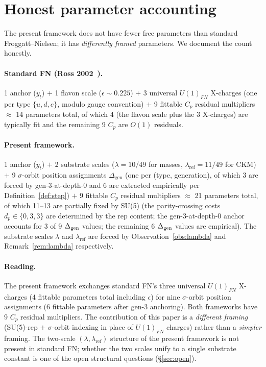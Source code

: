\documentclass[11pt,reqno]{amsart}
\theoremstyle{plain}
\theoremstyle{definition}
\theoremstyle{remark}
\begin{document}
\section{Honest parameter accounting}\label{sec:params}

The present framework does not have fewer free parameters than
standard Froggatt--Nielsen; it has \emph{differently framed}
parameters. We document the count honestly.

\paragraph{Standard FN (Ross 2002~\cite{Ross2002}).} 1 anchor
($y_t$) $+$ 1 flavon scale ($\epsilon \sim 0.225$) $+$ 3
universal $U(1)_{FN}$ X-charges (one per type $\{u, d, e\}$,
modulo gauge convention) $+$ 9 fittable $C_{p}$ residual
multipliers $\approx$ 14 parameters total, of which 4 (the
flavon scale plus the 3 X-charges) are typically fit and the
remaining 9 $C_p$ are $O(1)$ residuals.

\paragraph{Present framework.} 1 anchor ($y_t$) $+$ 2 substrate
scales ($\lambda = 10/49$ for masses, $\lambda_{\mathrm{ref}} =
11/49$ for CKM) $+$ 9 $\sigma$-orbit position assignments
$\Delta_{\mathrm{gen}}$ (one per (type, generation), of which
3 are forced by gen-3-at-depth-0 and 6 are extracted
empirically per Definition~\ref{def:step}) $+$ 9 fittable
$C_{p}$ residual multipliers $\approx$ 21 parameters total, of
which 11--13 are partially fixed by SU(5) (the parity-crossing
costs $d_p \in \{0, 3, 3\}$ are determined by the rep content;
the gen-3-at-depth-0 anchor accounts for 3 of 9 $\Delta_{\rm
gen}$ values; the remaining 6 $\Delta_{\rm gen}$ values are
empirical). The substrate scales $\lambda$ and
$\lambda_{\mathrm{ref}}$ are forced by Observation~\ref{obs:lambda}
and Remark~\ref{rem:lambda} respectively.

\paragraph{Reading.} The present framework exchanges standard
FN's three universal $U(1)_{FN}$ X-charges (4 fittable
parameters total including $\epsilon$) for nine
$\sigma$-orbit position assignments (6 fittable parameters
after gen-3 anchoring). Both frameworks have 9 $C_p$ residual
multipliers. The contribution of this paper is a
\emph{different framing} (SU(5)-rep $+$ $\sigma$-orbit
indexing in place of $U(1)_{FN}$ charges) rather than a
\emph{simpler} framing. The two-scale
$(\lambda, \lambda_{\mathrm{ref}})$ structure of the present
framework is not present in standard FN; whether the two
scales unify to a single substrate constant is one of the
open structural questions (\S\ref{sec:open}).
\end{document}

